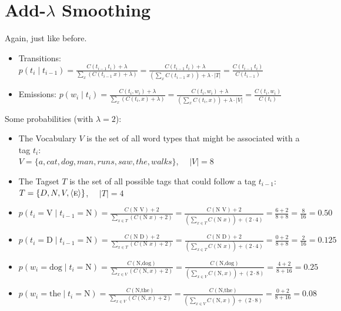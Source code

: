 \documentclass[11pt,letterpaper]{article}
\newcommand{\ngramend}{\ensuremath{\langle \textsc{e} \rangle}}
\newcommand{\tcurr}{\ensuremath{t_i}}
\newcommand{\tprev}{\ensuremath{t_{i-1}}}
\begin{document}
\section{Add-$\lambda$ Smoothing}

Again, just like before.

\begin{itemize}
  \item Transitions: $p(t_i \mid t_{i-1}) 
             = \frac{C(t_{i-1}~t_i)+\lambda}{\sum_x (C(t_{i-1}~x)+\lambda)} 
             = \frac{C(t_{i-1}~t_i)+\lambda}{(\sum_x C(t_{i-1}~x))+\lambda\cdot|T|} 
             = \frac{C(t_{i-1}~t_i)}{C(t_{i-1})}$
  \item Emissions: $p(w_i \mid t_i) 
             = \frac{C(t_i,w_i)+\lambda}{\sum_x (C(t_i,x)+\lambda)} 
             = \frac{C(t_i,w_i)+\lambda}{(\sum_x C(t_i,x))+\lambda\cdot|V|} 
             = \frac{C(t_i,w_i)}{C(t_i)}$
\end{itemize}

Some probabilities (with $\lambda=2$):

\begin{itemize}
  \item The Vocabulary $V$ is the set of all word types that might be associated with a tag \tcurr:   \vspace{2mm} \\
  $V = \{ a, cat, dog, man, runs, saw, the, walks \}$, ~~$|V|=8$
  \item The Tagset $T$ is the set of all possible tags that could follow a tag \tprev:   \vspace{2mm} \\
        $T = \{ D, N, V, \ngramend \}$, ~~$|T|=4$
  \\
  \item $p(t_i=\text{V} \mid t_{i-1}=\text{N}) 
     = \frac{C(\text{N V})+2}{\sum_{x \in T} (C(\text{N } x)+2)} 
     = \frac{C(\text{N V})+2}{(\sum_{x \in T} C(\text{N } x))+(2 \cdot 4)} 
     = \frac{6+2}{8+8} 
     = \frac{8}{16} = 0.50$
  \item $p(t_i=\text{D} \mid t_{i-1}=\text{N}) 
     = \frac{C(\text{N D})+2}{\sum_{x \in T} (C(\text{N } x)+2)} 
     = \frac{C(\text{N D})+2}{(\sum_{x \in T} C(\text{N } x))+(2 \cdot 4)} 
     = \frac{0+2}{8+8}
     = \frac{2}{16} = 0.125$
  \\
  \item $p(w_i=\text{dog} \mid t_i=\text{N}) 
     = \frac{C(\text{N,dog})}{\sum_{x \in V} (C(\text{N},x)+2)} 
     = \frac{C(\text{N,dog})}{(\sum_{x \in V} C(\text{N},x))+(2 \cdot 8)} 
     = \frac{4+2}{8+16}
     = 0.25$
  \item $p(w_i=\text{the} \mid t_i=\text{N}) 
     = \frac{C(\text{N,the})}{\sum_{x \in V} (C(\text{N},x)+2)} 
     = \frac{C(\text{N,the})}{(\sum_{x \in V} C(\text{N},x))+(2 \cdot 8)} 
     = \frac{0+2}{8+16} 
     = 0.08$
\end{itemize}
\end{document}
